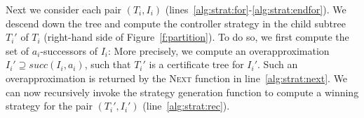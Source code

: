 

Next we consider each pair $(T_i, I_i)$
(lines~\ref{alg:strat:for}-\ref{alg:strat:endfor}). We descend
down the tree and compute the controller strategy in the child
subtree $T_i'$ of $T_i$ (right-hand side of Figure~\ref{f:partition}).
To do so, we first compute the set of $a_i$-successors of $I_i$:
More precisely, we compute an overapproximation $I_i'\supseteq
succ(I_i, a_i)$, such that $T_i'$ is a certificate
tree for $I_i'$.  Such an overapproximation is returned by the
\textsc{Next} function in line~\ref{alg:strat:next}.  We can now
recursively invoke the strategy generation function to compute a
winning strategy for the pair $(T_i', I_i')$
(line~\ref{alg:strat:rec}).



